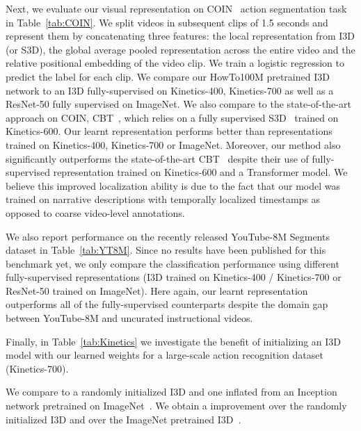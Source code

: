 \documentclass[10pt,twocolumn,letterpaper]{article}
\begin{document}
Next, we evaluate our visual representation on COIN~\cite{tang2019coin} action segmentation task in Table~\ref{tab:COIN}.
We split videos in subsequent clips of 1.5 seconds and represent them by concatenating three features: the local representation from I3D (or S3D), the global average pooled representation across the entire video and the relative positional embedding of the video clip. 
We train a logistic regression to predict the label for each clip.
We compare our HowTo100M pretrained I3D network to an I3D fully-supervised on Kinetics-400, Kinetics-700 as well as a ResNet-50 fully supervised on ImageNet.
We also compare to the state-of-the-art approach on COIN, CBT~\cite{sun2019contrastive}, which relies on a fully supervised S3D~\cite{xie2018rethinking} trained on Kinetics-600.
Our learnt representation performs better than representations trained on Kinetics-400, Kinetics-700 or ImageNet.
Moreover, our method also significantly outperforms the state-of-the-art CBT~\cite{sun2019contrastive} despite their use of fully-supervised representation trained on Kinetics-600 and a Transformer model.
We believe this improved localization ability is due to the fact that our model was trained on narrative descriptions with temporally localized timestamps
as opposed to coarse video-level annotations.


We also report performance on the recently released YouTube-8M Segments dataset in Table~\ref{tab:YT8M}.
Since no results have been published for this benchmark yet, we only compare the classification performance using different fully-supervised representations (\ie I3D trained on Kinetics-400 / Kinetics-700 or ResNet-50 trained on ImageNet).
Here again, our learnt representation outperforms all of the fully-supervised counterparts despite the domain gap between YouTube-8M and uncurated instructional videos.

Finally, in Table~\ref{tab:Kinetics} we investigate the benefit of initializing an I3D model with our learned weights for a large-scale action recognition dataset (\ie Kinetics-700).

We compare to a randomly initialized I3D and one inflated from an Inception network pretrained on ImageNet~\cite{carreira2017quovadis}.
We obtain a  improvement over the randomly initialized I3D and  over the ImageNet pretrained I3D~\cite{carreira2017quovadis}.
\end{document}
